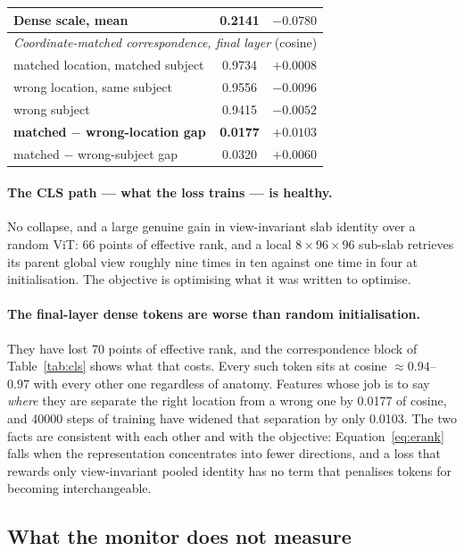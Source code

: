 \documentclass[11pt,a4paper]{article}
\newcommand{\best}[1]{\textbf{#1}}
\begin{document}
\begin{table}[H]
\begin{tabular}{lcc}
    \quad Dense scale, mean & 0.2141 & $-0.0780$ \\
    \midrule
    \multicolumn{3}{l}{\emph{Coordinate-matched correspondence, final layer} (cosine)} \\
    \quad matched location, matched subject & 0.9734 & $+0.0008$ \\
    \quad wrong location, same subject & 0.9556 & $-0.0096$ \\
    \quad wrong subject & 0.9415 & $-0.0052$ \\
    \quad \textbf{matched $-$ wrong-location gap} & \best{0.0177} & $+0.0103$ \\
    \quad matched $-$ wrong-subject gap & 0.0320 & $+0.0060$ \\
    \bottomrule
  \end{tabular}
\end{table}

\paragraph{The CLS path --- what the loss trains --- is healthy.} No collapse, and a large genuine gain
in view-invariant slab identity over a random ViT: \num{66} points of effective rank, and a local
$8\times96\times96$ sub-slab retrieves its parent global view roughly nine times in ten against one time
in four at initialisation. The objective is optimising what it was written to optimise.

\paragraph{The final-layer dense tokens are worse than random initialisation.} They have lost \num{70}
points of effective rank, and the correspondence block of Table~\ref{tab:cls} shows what that costs. Every such token sits at cosine
$\approx 0.94$--$0.97$ with every other one regardless of anatomy. Features whose job is to say
\emph{where} they are separate the right location from a wrong one by \num{0.0177} of cosine, and
\num{40000} steps of training have widened that separation by only \num{0.0103}. The two facts are
consistent with each other and with the objective: Equation~\ref{eq:erank} falls when the representation
concentrates into fewer directions, and a loss that rewards only view-invariant pooled identity has no
term that penalises tokens for becoming interchangeable.

\subsection{What the monitor does not measure}
\label{sec:scope}
\end{document}
